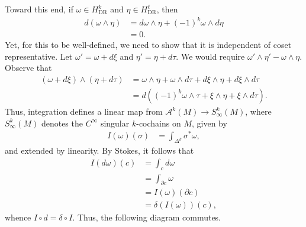 \documentclass[10pt]{mypackage}
\begin{document}
Toward this end, if $\omega\in H^{k}_{\operatorname{DR}}$ and $\eta\in H^{\ell}_{\operatorname{DR}}$, then
\begin{align*}
  d\left( \omega\wedge\eta \right) &= d\omega\wedge\eta + \left( -1 \right)^{k} \omega\wedge d\eta\\
                                   &= 0.
\end{align*}
Yet, for this to be well-defined, we need to show that it is independent of coset representative. Let $\omega' = \omega + d\xi$ and $\eta' = \eta + d\tau$. We would require $\omega'\wedge\eta' - \omega\wedge\eta$. Observe that
\begin{align*}
  \left( \omega + d\xi \right)\wedge \left( \eta + d\tau \right) &= \omega\wedge\eta + \omega\wedge d\tau + d\xi\wedge\eta + d\xi\wedge d\tau\\
                                                                 &= d\left( \left( -1 \right)^{k}\omega\wedge\tau + \xi\wedge\eta + \xi\wedge d\tau \right).
\end{align*}
Thus, integration defines a linear map from $\mathcal{A}^{k}\left( M \right)\rightarrow S^{k}_{\infty}\left( M \right)$, where $S^{k}_{\infty}\left( M \right)$ denotes the $C^{\infty}$ singular $k$-cochains on $M$, given by
\begin{align*}
  I\left( \omega \right)\left( \sigma \right) &= \int_{\Delta^{k}}^{} \sigma^{\ast}\omega,
\end{align*}
and extended by linearity. By Stokes, it follows that
\begin{align*}
  I\left( d\omega \right)\left( c \right) &= \int_{c}^{}d\omega\\
                                          &= \int_{\partial c}^{} \omega\\
                                          &= I(\omega)\left( \partial c \right)\\
                                          &= \delta\left( I\left( \omega \right) \right)(c),
\end{align*}
whence $I\circ d = \delta\circ I$. Thus, the following diagram commutes.
\begin{center}
\end{center}
\end{document}
